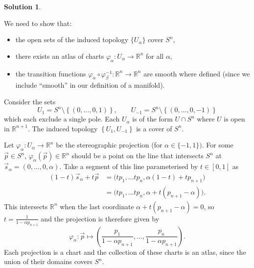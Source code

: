 \documentclass[11pt, a4paper]{report}
\theoremstyle{definition}
\newtheorem{sol}{Solution}[part]
\begin{document}
\begin{sol}\label{sol:stereographicprojection}

We need to show that:
\begin{itemize}
    \item the open sets of the induced topology $\{U_\alpha\}$ cover $S^n$,
    \item there exists an atlas of charts $\varphi_\alpha: U_\alpha \to \mathbb{R}^n$ for all $\alpha$,
    \item the transition functions $\varphi_\alpha \circ \varphi_\beta^{-1}: \mathbb{R}^n \to \mathbb{R}^n$ are smooth where defined (since we include ``smooth'' in our definition of a manifold).
\end{itemize}

Consider the sets
\[
    U_1 = S^n \setminus \left\{(0, \ldots, 0, 1)\right\}, \qquad
    U_{-1} = S^n \setminus \left\{(0, \ldots, 0, -1)\right\}
\]
which each exclude a single pole. Each $U_\alpha$ is of the form $U \cap S^n$ where $U$ is open in $\mathbb{R}^{n + 1}$.
The induced topology $\left\{U_1, U_{-1}\right\}$ is a cover of $S^n$.

Let $\varphi_\alpha: U_\alpha \to \mathbb{R}^n$ be the stereographic projection (for $\alpha \in \{-1, 1\})$.
For some $\vec{p} \in S^n$, $\varphi_\alpha(\vec{p}) \in \mathbb{R}^n$ should be a point on the line that intersects $S^n$ at $\vec{s}_\alpha = (0, \ldots, 0, \alpha)$.
Take a segment of this line parameterised by $t \in [0, 1]$ as
\begin{align*}
    (1 - t) \vec{s}_\alpha + t\vec{p} &= \bigl( t p_1, \ldots t p_n, \alpha(1 - t) + tp_{n + 1} \bigr) \\
        &= \bigl( t p_1, \ldots t p_n, \alpha + t(p_{n + 1} - \alpha) \bigr).
\end{align*}
This intersects $\mathbb{R}^n$ when the last coordinate $\alpha + t(p_{n + 1} - \alpha) = 0$, so $t = \frac{1}{1 - \alpha p_{n + 1}}$ and the projection is therefore given by
\[
    \varphi_\alpha: \vec{p} \mapsto \left(\frac{p_1}{1 - \alpha p_{n + 1}}, \ldots, \frac{p_n}{1 - \alpha p_{n + 1}}\right).
\]
Each projection is a chart and the collection of these charts is an atlas, since the union of their domains covers $S^n$.


\end{sol}
\end{document}
